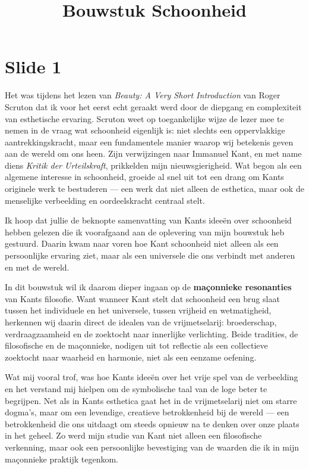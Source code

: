 \documentclass{article}
\title{Bouwstuk Schoonheid}
\author{}
\date{}
\begin{document}
\maketitle

\section*{Slide 1}

Het was tijdens het lezen van \textit{Beauty: A Very Short Introduction} van Roger Scruton dat ik voor het eerst echt geraakt werd door de diepgang en complexiteit van esthetische ervaring. Scruton weet op toegankelijke wijze de lezer mee te nemen in de vraag wat schoonheid eigenlijk is: niet slechts een oppervlakkige aantrekkingskracht, maar een fundamentele manier waarop wij betekenis geven aan de wereld om ons heen. Zijn verwijzingen naar Immanuel Kant, en met name diens \textit{Kritik der Urteilskraft}, prikkelden mijn nieuwsgierigheid. Wat begon als een algemene interesse in schoonheid, groeide al snel uit tot een drang om Kants originele werk te bestuderen — een werk dat niet alleen de esthetica, maar ook de menselijke verbeelding en oordeelskracht centraal stelt.

Ik hoop dat jullie de beknopte samenvatting van Kants ideeën over schoonheid hebben gelezen die ik voorafgaand aan de oplevering van mijn bouwstuk heb gestuurd. Daarin kwam naar voren hoe Kant schoonheid niet alleen als een persoonlijke ervaring ziet, maar als een universele die ons verbindt met anderen en met de wereld.

In dit bouwstuk wil ik daarom dieper ingaan op de \textbf{maçonnieke resonanties} van Kants filosofie. Want wanneer Kant stelt dat schoonheid een brug slaat tussen het individuele en het universele, tussen vrijheid en wetmatigheid, herkennen wij daarin direct de idealen van de vrijmetselarij: broederschap, verdraagzaamheid en de zoektocht naar innerlijke verlichting. Beide tradities, de filosofische en de maçonnieke, nodigen uit tot reflectie als een collectieve zoektocht naar waarheid en harmonie, niet als een eenzame oefening.

Wat mij vooral trof, was hoe Kants ideeën over het vrije spel van de verbeelding en het verstand mij hielpen om de symbolische taal van de loge beter te begrijpen. Net als in Kants esthetica gaat het in de vrijmetselarij niet om starre dogma’s, maar om een levendige, creatieve betrokkenheid bij de wereld — een betrokkenheid die ons uitdaagt om steeds opnieuw na te denken over onze plaats in het geheel. Zo werd mijn studie van Kant niet alleen een filosofische verkenning, maar ook een persoonlijke bevestiging van de waarden die ik in mijn maçonnieke praktijk tegenkom.
\end{document}
